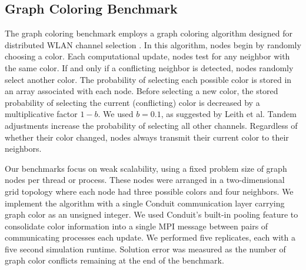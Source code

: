 \subsection{ Graph Coloring Benchmark } \label{sec:graph-coloring-benchmark}

The graph coloring benchmark employs a graph coloring algorithm designed for distributed WLAN channel selection \citep{leith2012wlan}.
In this algorithm, nodes begin by randomly choosing a color.
Each computational update, nodes test for any neighbor with the same color.
If and only if a conflicting neighbor is detected, nodes randomly select another color.
The probability of selecting each possible color is stored in an array associated with each node.
Before selecting a new color, the stored probability of selecting the current (conflicting) color is decreased by a multiplicative factor $1 - b$.
We used $b=0.1$, as suggested by Leith et al.
Tandem adjustments increase the probability of selecting all other channels.
Regardless of whether their color changed, nodes always transmit their current color to their neighbors.

Our benchmarks focus on weak scalability, using a fixed problem size of  graph nodes per thread or process.
These nodes were arranged in a two-dimensional grid topology where each node had three possible colors and four neighbors.
We implement the algorithm with a single Conduit communication layer carrying graph color as an unsigned integer.
We used Conduit's built-in pooling feature to consolidate color information into a single MPI message between pairs of communicating processes each update.
We performed five replicates, each with a five second simulation runtime.
Solution error was measured as the number of graph color conflicts remaining at the end of the benchmark.
